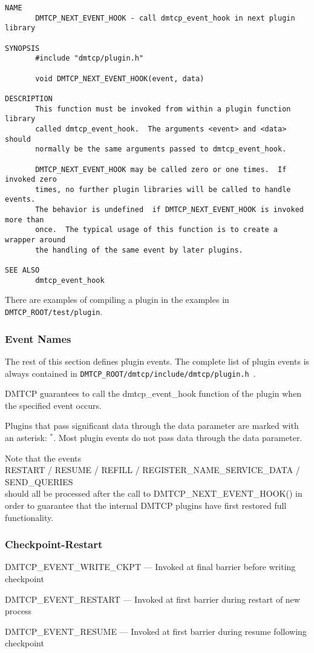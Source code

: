 \documentclass{article}
\begin{document}
\begin{verbatim}
NAME
       DMTCP_NEXT_EVENT_HOOK - call dmtcp_event_hook in next plugin library

SYNOPSIS
       #include "dmtcp/plugin.h"

       void DMTCP_NEXT_EVENT_HOOK(event, data)

DESCRIPTION
       This function must be invoked from within a plugin function library
       called dmtcp_event_hook.  The arguments <event> and <data> should
       normally be the same arguments passed to dmtcp_event_hook.

       DMTCP_NEXT_EVENT_HOOK may be called zero or one times.  If invoked zero
       times, no further plugin libraries will be called to handle events.
       The behavior is undefined  if DMTCP_NEXT_EVENT_HOOK is invoked more than
       once.  The typical usage of this function is to create a wrapper around
       the handling of the same event by later plugins.

SEE ALSO
       dmtcp_event_hook
\end{verbatim}

There are examples of compiling a plugin in the examples in {\tt
DMTCP\_ROOT/test/plugin}.

\subsubsection{Event Names}

The rest of this section defines plugin events.
The complete list of plugin events is always contained in
{\tt DMTCP\_ROOT/dmtcp/include/dmtcp/plugin.h}~.

DMTCP guarantees to call the dmtcp\_event\_hook function of the plugin
when the specified event occurs.

Plugins that pass significant data through the data parameter
are marked with an asterisk: {}$^*$.
Most plugin events do not pass data through the data parameter.

Note that the events \\
   RESTART / RESUME / REFILL / REGISTER\_NAME\_SERVICE\_DATA / SEND\_QUERIES \\
should all be processed after the call to DMTCP\_NEXT\_EVENT\_HOOK() in
order to guarantee that the internal DMTCP plugins have first restored full
functionality.

\itemsep0pt
\subsubsection*{Checkpoint-Restart}
\begin{list}{}{\leftmargin=3em \itemindent=-2em}
\item
  DMTCP\_EVENT\_WRITE\_CKPT --- Invoked at final barrier before writing checkpoint
\item
  DMTCP\_EVENT\_RESTART --- Invoked at first barrier during restart of new process
\item
  DMTCP\_EVENT\_RESUME --- Invoked at first barrier during resume following checkpoint
\end{list}
\end{document}
